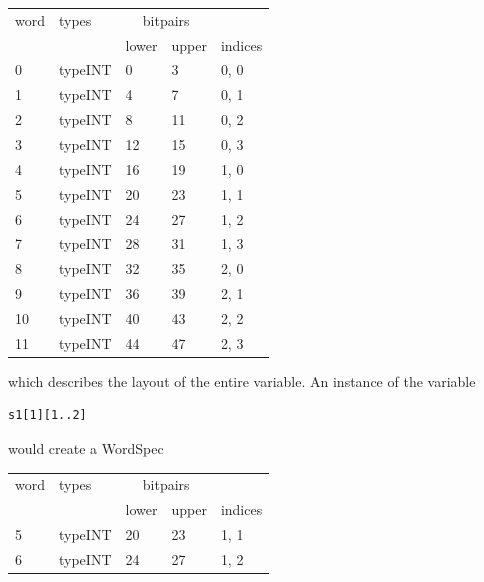             \begin{tabular}{| l || l || l l | l |}
            \hline
            word  & types    & \multicolumn{2}{c|}{bitpairs} & \\
                  &          & lower & upper & indices \\
            \hline \hline
             0    & typeINT  & 0     & 3     & 0, 0  \\ \hline
             1    & typeINT  & 4     & 7     & 0, 1  \\ \hline
             2    & typeINT  & 8     & 11    & 0, 2  \\ \hline
             3    & typeINT  & 12    & 15    & 0, 3  \\ \hline
             4    & typeINT  & 16    & 19    & 1, 0  \\ \hline
             5    & typeINT  & 20    & 23    & 1, 1  \\ \hline
             6    & typeINT  & 24    & 27    & 1, 2  \\ \hline
             7    & typeINT  & 28    & 31    & 1, 3  \\ \hline
             8    & typeINT  & 32    & 35    & 2, 0  \\ \hline
             9    & typeINT  & 36    & 39    & 2, 1  \\ \hline
            10    & typeINT  & 40    & 43    & 2, 2  \\ \hline
            11    & typeINT  & 44    & 47    & 2, 3  \\ \hline
            \end{tabular}

            which describes the layout of the entire variable. An instance of the
            variable
            \begin{lstlisting}[gobble=12, language=threepl]
             s1[1][1..2]
            \end{lstlisting}
            would create a WordSpec

            \begin{tabular}{| l || l || l l | l |}
            \hline
            word  & types    & \multicolumn{2}{c|}{bitpairs} & \\
                  &          & lower & upper & indices \\
            \hline \hline
             5    & typeINT  & 20    & 23    & 1, 1  \\ \hline
             6    & typeINT  & 24    & 27    & 1, 2  \\ \hline
            \end{tabular}

